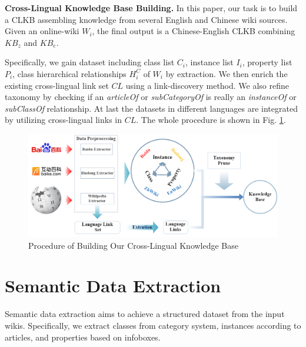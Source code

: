 \documentclass[runningheads,a4paper]{llncs}
\newcommand{\para}[1]{\vspace{0.1cm}\noindent\textbf{#1}}
\begin{document}
\para{Cross-Lingual Knowledge Base Building.} In this paper, our task is to build a CLKB assembling knowledge from several English and Chinese wiki sources. Given an online-wiki $W_{i}$, the final output is a Chinese-English CLKB combining $KB_{z}$ and $KB_{e}$. 

Specifically, we gain dataset including class list $C_{i}$, instance list $I_{i}$, property list $P_{i}$, class hierarchical relationships $H^C_{i}$ of $W_{i}$ by extraction. We then enrich the existing cross-lingual link set $CL$ using a link-discovery method. We also refine taxonomy by checking if an \textit{articleOf} or \textit{subCategoryOf} is really an \textit{instanceOf} or \textit{subClassOf} relationship. At last the datasets in different languages are integrated by utilizing cross-lingual links in $CL$. The whole procedure is shown in Fig. \ref{fig:procedure}. 

\begin{figure}[ht]
    \centerline{\includegraphics[width=1\columnwidth]{fig/procedure2}}
    \caption{Procedure of Building Our Cross-Lingual Knowledge Base}
    \label{fig:procedure}
\end{figure}

\section{Semantic Data Extraction}
\label{sec:sde}
Semantic data extraction aims to achieve a structured dataset from the input wikis. Specifically, we extract classes from category system, instances according to articles, and properties based on infoboxes.
\end{document}
